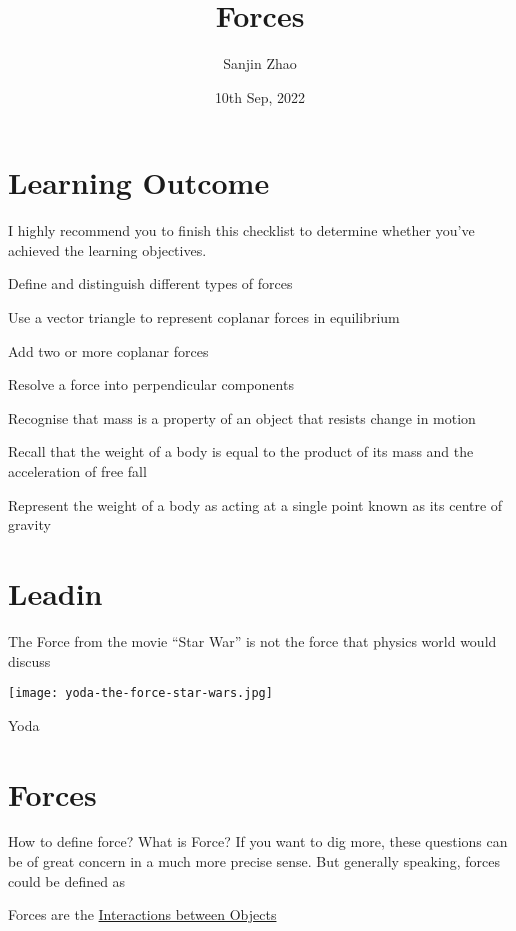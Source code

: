 \documentclass[a4paper]{tufte-handout}
\title{Forces}
\author{Sanjin Zhao}
\date{10th Sep, 2022}  %
\newenvironment{SummBox}
{\begin{tcolorbox}[breakable,colback=r1!30,colframe=r1,title=Summary]} {\end{tcolorbox}}
\begin{document}
\maketitle%
\section*{Learning Outcome}

I highly recommend you to finish this checklist to determine whether you've achieved the learning objectives.
\begin{todolist}
  \item Define and distinguish different types of forces
  \item Use a vector triangle to represent coplanar forces in equilibrium
  \item Add two or more coplanar forces
  \item Resolve a force into perpendicular components
  \item Recognise that mass is a property of an object that resists change in motion
  \item Recall that the weight of a body is equal to the product of its mass and the acceleration of free fall
  \item Represent the weight of a body as acting at a single point known as its centre of gravity
\end{todolist}
\clearpage

\section{Leadin}
The Force from the movie ``Star War'' is not the force that physics world would discuss
\begin{marginfigure}
\texttt{[image: yoda-the-force-star-wars.jpg]}
\caption{Yoda}
\end{marginfigure}

\section{Forces}
How to define force? What is Force? If you want to dig more, these questions can be of great concern in a much more precise sense. But generally speaking, forces could be defined as
\begin{SummBox}
Forces are the \uline{Interactions between Objects}
\end{SummBox}
\end{document}
